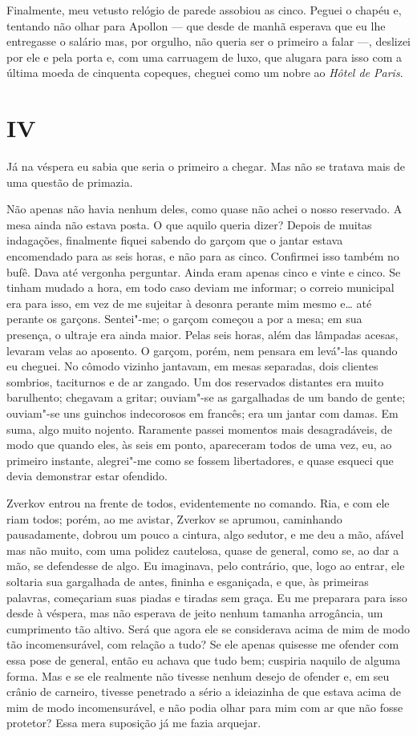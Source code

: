Finalmente, meu vetusto relógio de parede assobiou as cinco. Peguei o
chapéu e, tentando não olhar para Apollon --- que desde de manhã esperava
que eu lhe entregasse o salário mas, por orgulho, não queria ser o
primeiro a falar ---, deslizei por ele e pela porta e, com uma carruagem
de luxo, que alugara para isso com a última moeda de cinquenta copeques,
cheguei como um nobre ao \emph{Hôtel de Paris}.

\section{IV}

Já na véspera eu sabia que seria o primeiro a chegar. Mas não se tratava
mais de uma questão de primazia.

Não apenas não havia nenhum deles, como quase não achei o nosso
reservado. A mesa ainda não estava posta. O que aquilo queria dizer?
Depois de muitas indagações, finalmente fiquei sabendo do garçom que o
jantar estava encomendado para as seis horas, e não para as cinco.
Confirmei isso também no bufê. Dava até vergonha perguntar. Ainda eram
apenas cinco e vinte e cinco. Se tinham mudado a hora, em todo caso
deviam me informar; o correio municipal era para isso, em vez de me
sujeitar à desonra perante mim mesmo e\ldots{} até perante os garçons.
Sentei"-me; o garçom começou a por a mesa; em sua presença, o ultraje era
ainda maior. Pelas seis horas, além das lâmpadas acesas, levaram velas
ao aposento. O garçom, porém, nem pensara em levá"-las quando eu cheguei.
No cômodo vizinho jantavam, em mesas separadas, dois clientes sombrios,
taciturnos e de ar zangado. Um dos reservados distantes era muito
barulhento; chegavam a gritar; ouviam"-se as gargalhadas de um bando de
gente; ouviam"-se uns guinchos indecorosos em francês; era um jantar com
damas. Em suma, algo muito nojento. Raramente passei momentos mais
desagradáveis, de modo que quando eles, às seis em ponto, apareceram
todos de uma vez, eu, ao primeiro instante, alegrei"-me como se fossem
libertadores, e quase esqueci que devia demonstrar estar ofendido.

Zverkov entrou na frente de todos, evidentemente no comando. Ria, e com
ele riam todos; porém, ao me avistar, Zverkov se aprumou, caminhando
pausadamente, dobrou um pouco a cintura, algo sedutor, e me deu a mão,
afável mas não muito, com uma polidez cautelosa, quase de general, como
se, ao dar a mão, se defendesse de algo. Eu imaginava, pelo contrário,
que, logo ao entrar, ele soltaria sua gargalhada de antes, fininha e
esganiçada, e que, às primeiras palavras, começariam suas piadas e
tiradas sem graça. Eu me preparara para isso desde à véspera, mas não
esperava de jeito nenhum tamanha arrogância, um cumprimento tão altivo.
Será que agora ele se considerava acima de mim de modo tão
incomensurável, com relação a tudo? Se ele apenas quisesse me ofender
com essa pose de general, então eu achava que tudo bem; cuspiria naquilo
de alguma forma. Mas e se ele realmente não tivesse nenhum desejo de
ofender e, em seu crânio de carneiro, tivesse penetrado a sério a
ideiazinha de que estava acima de mim de modo incomensurável, e não
podia olhar para mim com ar que não fosse protetor? Essa mera suposição
já me fazia arquejar.


